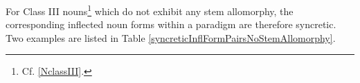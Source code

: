 For Class III nouns\footnote{Cf. \SEC\ref{NclassIII}.} 
which do not exhibit any stem allomorphy, %
the corresponding inflected noun forms within a paradigm are therefore syncretic. %
Two examples are listed in Table \vref{syncreticInflFormPairsNoStemAllomorphy}.
\begin{table}[h]\centering
\caption{Syncretic inflectional form sets for Class III nouns without stem allomorphy}\label{syncreticInflFormPairsNoStemAllomorphy}
\end{table}

